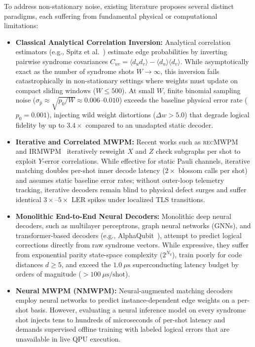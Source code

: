 \documentclass[aps,prxquantum,reprint,superscriptaddress,floatfix,nofootinbib]{revtex4-2}
\begin{document}
To address non-stationary noise, existing literature proposes several distinct paradigms, each suffering from fundamental physical or computational limitations:
\begin{itemize}
    \item \textbf{Classical Analytical Correlation Inversion:} Analytical correlation estimators (e.g., Spitz et al.~\cite{spitz2018adaptive}) estimate edge probabilities by inverting pairwise syndrome covariances $C_{uv} = \langle d_u d_v \rangle - \langle d_u \rangle \langle d_v \rangle$. While asymptotically exact as the number of syndrome shots $W \to \infty$, this inversion fails catastrophically in non-stationary settings where weights must update on compact sliding windows ($W \le 500$). At small $W$, finite binomial sampling noise ($\sigma_{\hat{p}} \approx \sqrt{p_0/W} \approx 0.006\text{--}0.010$) exceeds the baseline physical error rate ($p_0 = 0.001$), injecting wild weight distortions ($\Delta w > 5.0$) that degrade logical fidelity by up to $3.4\times$ compared to an unadapted static decoder.
    \item \textbf{Iterative and Correlated MWPM:} Recent works such as \textsc{recMWPM}~\cite{cowtan2023correlated} and \textsc{IRMWPM}~\cite{tian2025iterative} iteratively reweight $X$ and $Z$ check subgraphs per shot to exploit $Y$-error correlations. While effective for static Pauli channels, iterative matching doubles per-shot inner decode latency ($2\times$ blossom calls per shot) and assumes static baseline error rates; without outer-loop telemetry tracking, iterative decoders remain blind to physical defect surges and suffer identical $3\times\text{--}5\times$ LER spikes under localized TLS transitions.
    \item \textbf{Monolithic End-to-End Neural Decoders:} Monolithic deep neural decoders, such as multilayer perceptrons, graph neural networks (GNNs), and transformer-based decoders (e.g., AlphaQubit~\cite{bausch2024learning}), attempt to predict logical corrections directly from raw syndrome vectors. While expressive, they suffer from exponential parity state-space complexity ($2^{N_q}$), train poorly for code distances $d \ge 5$, and exceed the $1.0\ \mu\text{s}$ superconducting latency budget by orders of magnitude ($>100\ \mu\text{s}/\text{shot}$).
    \item \textbf{Neural MWPM (NMWPM):} Neural-augmented matching decoders~\cite{peled2026neural} employ neural networks to predict instance-dependent edge weights on a per-shot basis. However, evaluating a neural inference model on every syndrome shot injects tens to hundreds of microseconds of per-shot latency and demands supervised offline training with labeled logical errors that are unavailable in live QPU execution.

\end{itemize}
\end{document}
